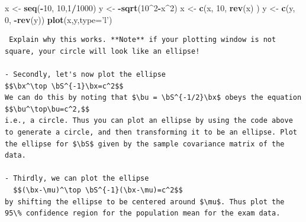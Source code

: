 \documentclass[]{book}
\newenvironment{Shaded}{\begin{snugshade}}{\end{snugshade}}
\newcommand{\DataTypeTok}[1]{\textcolor[rgb]{0.13,0.29,0.53}{#1}}
\newcommand{\DecValTok}[1]{\textcolor[rgb]{0.00,0.00,0.81}{#1}}
\newcommand{\KeywordTok}[1]{\textcolor[rgb]{0.13,0.29,0.53}{\textbf{#1}}}
\newcommand{\NormalTok}[1]{#1}
\newcommand{\OperatorTok}[1]{\textcolor[rgb]{0.81,0.36,0.00}{\textbf{#1}}}
\newcommand{\StringTok}[1]{\textcolor[rgb]{0.31,0.60,0.02}{#1}}
\theoremstyle{definition}
\theoremstyle{definition}
\theoremstyle{definition}
\theoremstyle{remark}
\begin{document}
\begin{Shaded}
\begin{Highlighting}[]
\NormalTok{x <-}\StringTok{ }\KeywordTok{seq}\NormalTok{(}\OperatorTok{-}\DecValTok{10}\NormalTok{, }\DecValTok{10}\NormalTok{,}\DecValTok{1}\OperatorTok{/}\DecValTok{1000}\NormalTok{) }
\NormalTok{y <-}\StringTok{ }\OperatorTok{-}\KeywordTok{sqrt}\NormalTok{(}\DecValTok{10}\OperatorTok{^}\DecValTok{2}\OperatorTok{-}\NormalTok{x}\OperatorTok{^}\DecValTok{2}\NormalTok{)}
\NormalTok{x <-}\StringTok{ }\KeywordTok{c}\NormalTok{(x, }\DecValTok{10}\NormalTok{, }\KeywordTok{rev}\NormalTok{(x) )}
\NormalTok{y <-}\StringTok{ }\KeywordTok{c}\NormalTok{(y, }\DecValTok{0}\NormalTok{, }\OperatorTok{-}\KeywordTok{rev}\NormalTok{(y))}
\KeywordTok{plot}\NormalTok{(x,y,}\DataTypeTok{type=}\StringTok{'l'}\NormalTok{)}
\end{Highlighting}
\end{Shaded}

\begin{verbatim}
 Explain why this works. **Note** if your plotting window is not square, your circle will look like an ellipse!

- Secondly, let's now plot the ellipse 
$$\bx^\top \bS^{-1}\bx=c^2$$
We can do this by noting that $\bu = \bS^{-1/2}\bx$ obeys the equation
$$\bu^\top\bu=c^2,$$
i.e., a circle. Thus you can plot an ellipse by using the code above to generate a circle, and then transforming it to be an ellipse. Plot the ellipse for $\bS$ given by the sample covariance matrix of the data.

- Thirdly, we can plot the ellipse
  $$(\bx-\mu)^\top \bS^{-1}(\bx-\mu)=c^2$$
by shifting the ellipse to be centered around $\mu$. Thus plot the 95\% confidence region for the population mean for the exam data.
\end{verbatim}


\end{document}
